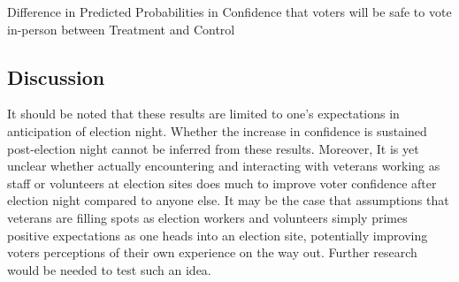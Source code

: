 \documentclass[
  12pt,
  letterpaper,
]{article}
\begin{document}
\begin{table}[t]

\caption{\label{tbl-preds-diff2}Difference in Predicted Probabilities in
Confidence that voters will be safe to vote in-person between Treatment
and Control}


\end{table}%

\newpage{}

\subsection{Discussion}\label{discussion}

It should be noted that these results are limited to one's expectations
in anticipation of election night. Whether the increase in confidence is
sustained post-election night cannot be inferred from these results.
Moreover, It is yet unclear whether actually encountering and
interacting with veterans working as staff or volunteers at election
sites does much to improve voter confidence after election night
compared to anyone else. It may be the case that assumptions that
veterans are filling spots as election workers and volunteers simply
primes positive expectations as one heads into an election site,
potentially improving voters perceptions of their own experience on the
way out. Further research would be needed to test such an idea.
\end{document}
